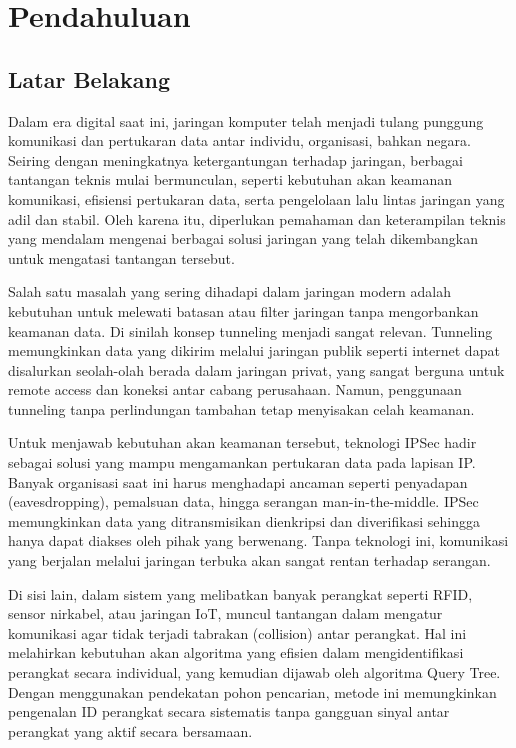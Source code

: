 \section{Pendahuluan}
\subsection{Latar Belakang}
Dalam era digital saat ini, jaringan komputer telah menjadi tulang punggung komunikasi dan pertukaran data antar individu, organisasi, bahkan negara. Seiring dengan meningkatnya ketergantungan terhadap jaringan, berbagai tantangan teknis mulai bermunculan, seperti kebutuhan akan keamanan komunikasi, efisiensi pertukaran data, serta pengelolaan lalu lintas jaringan yang adil dan stabil. Oleh karena itu, diperlukan pemahaman dan keterampilan teknis yang mendalam mengenai berbagai solusi jaringan yang telah dikembangkan untuk mengatasi tantangan tersebut.

Salah satu masalah yang sering dihadapi dalam jaringan modern adalah kebutuhan untuk melewati batasan atau filter jaringan tanpa mengorbankan keamanan data. Di sinilah konsep tunneling menjadi sangat relevan. Tunneling memungkinkan data yang dikirim melalui jaringan publik seperti internet dapat disalurkan seolah-olah berada dalam jaringan privat, yang sangat berguna untuk remote access dan koneksi antar cabang perusahaan. Namun, penggunaan tunneling tanpa perlindungan tambahan tetap menyisakan celah keamanan.

Untuk menjawab kebutuhan akan keamanan tersebut, teknologi IPSec hadir sebagai solusi yang mampu mengamankan pertukaran data pada lapisan IP. Banyak organisasi saat ini harus menghadapi ancaman seperti penyadapan (eavesdropping), pemalsuan data, hingga serangan man-in-the-middle. IPSec memungkinkan data yang ditransmisikan dienkripsi dan diverifikasi sehingga hanya dapat diakses oleh pihak yang berwenang. Tanpa teknologi ini, komunikasi yang berjalan melalui jaringan terbuka akan sangat rentan terhadap serangan.

Di sisi lain, dalam sistem yang melibatkan banyak perangkat seperti RFID, sensor nirkabel, atau jaringan IoT, muncul tantangan dalam mengatur komunikasi agar tidak terjadi tabrakan (collision) antar perangkat. Hal ini melahirkan kebutuhan akan algoritma yang efisien dalam mengidentifikasi perangkat secara individual, yang kemudian dijawab oleh algoritma Query Tree. Dengan menggunakan pendekatan pohon pencarian, metode ini memungkinkan pengenalan ID perangkat secara sistematis tanpa gangguan sinyal antar perangkat yang aktif secara bersamaan.

